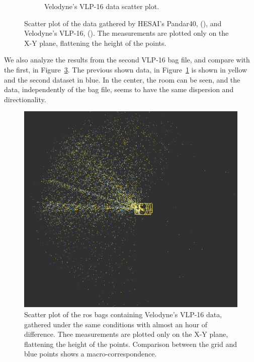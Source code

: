 \begin{figure}[ht!]
\begin{subfigure}[t]{0.45\textwidth}
	\caption{Velodyne's VLP-16 data scatter plot.}
	\label{fig:bosch-vlp16-1}
\end{subfigure}
\caption[Scatter plot top-view of both \acsp{lidar} interference on the dataset provided by Bosch.]{Scatter plot of the data gathered by HESAI's Pandar40, (), and Velodyne's VLP-16, (). The measurements are plotted only on the X-Y plane, flattening the height of the points.}
\label{fig:bosch-pandar-vs-vlp16}
\end{figure}

We also analyze the results from the second VLP-16 bag file, and compare with the first, in Figure~\ref{fig:bosch-vlp16-comparison}. The previous shown data, in Figure~\ref{fig:bosch-vlp16-1} is shown in yellow and the second dataset in blue. In the center, the room can be seen, and the data, independently of the bag file, seems to have the same dispersion and directionality.

\begin{figure}[ht!]
\centering
\includegraphics[scale=0.33]{img/bosch/vlp16-tests-overlaid.png}
\caption[Scattered plot of VLP-16 interference taken on two different instants, on the same conditions.]{Scatter plot of the \ac{ros} bags containing Velodyne's VLP-16 data, gathered under the same conditions with almost an hour of difference. Thee measurements are plotted only on the X-Y plane, flattening the height of the points. Comparison between the grid and blue points shows a macro-correspondence.}
\label{fig:bosch-vlp16-comparison}
\end{figure}

